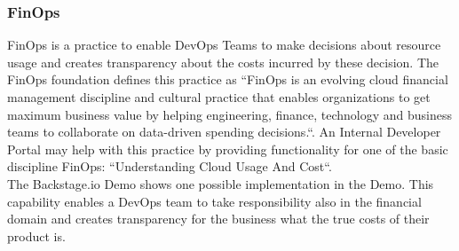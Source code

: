 \documentclass[a4paper,12pt]{article}
\begin{document}
    \subsubsection{FinOps}
    \label{sssec:finops}
    FinOps is a practice to enable DevOps Teams to make decisions about resource usage and creates transparency
    about the costs incurred by these decision.
    The FinOps foundation defines\parencite{finopsdefinition} this practice as ``FinOps is an evolving cloud financial management discipline and
    cultural practice that enables organizations to get maximum business value by helping engineering, finance,
    technology and business teams to collaborate on data-driven spending decisions.``.
    An Internal Developer Portal may help with this practice by providing functionality for one of the basic discipline
    FinOps: ``Understanding Cloud Usage And Cost``.\\
    The Backstage.io Demo shows one possible implementation in the Demo\parencite{backstagedemocost}.
    This capability enables a DevOps team to take responsibility also in the financial domain and creates transparency
    for the business what the true costs of their product is.
\end{document}
